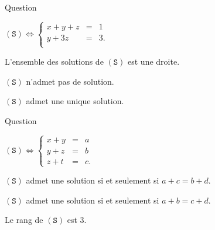 \begin{multi}[multiple,feedback=
{\[(\mathtt{S}) \Leftrightarrow  \left\{\begin{array}{rcc}
x+y+z&=&1\\
y+3z&=&3.\\
\end{array}\right.\]
L'ensemble des solutions de \((\mathtt{S})\) est la droite : \(\{(-2+2z,3-3z,z)\, ; \; z \in \Rr\}\).
}]{Question}
    \item* \((\mathtt{S}) \Leftrightarrow  \left\{\begin{array}{rcc}
x+y+z&=&1\\
y+3z&=&3.\\
\end{array}\right.\)
    \item* L'ensemble des solutions de \((\mathtt{S})\) est une droite.
    \item \((\mathtt{S})\) n'admet pas de solution.
    \item \((\mathtt{S})\) admet une unique solution.
\end{multi}


\begin{multi}[multiple,feedback=
{\[(\mathtt{S}) \Leftrightarrow  
\left\{\begin{array}{rcc}
x+y&=&a\\
y+z&=&b\\ 
z+t&=&c\\ 
0&=&b+d-a-c.\end{array}\right.\]
On en déduit que si \(a+c\neq b+d\), \((\mathtt{S})\) n'admet pas de solution et que si \(a+c= b+d\), 
\((\mathtt{S})\) en admet une infinité.
}]{Question}
    \item \((\mathtt{S}) \Leftrightarrow
\left\{\begin{array}{rcc}
x+y&=&a\\
y+z&=&b\\
z+t&=&c.\end{array}\right.\)
    \item* \((\mathtt{S})\) admet une  solution si et seulement si \(a+c=b+d\).
    \item \((\mathtt{S})\) admet une  solution si et seulement si \(a+b=c+d\).
    \item* Le rang de \((\mathtt{S})\) est \(3\).
\end{multi}



